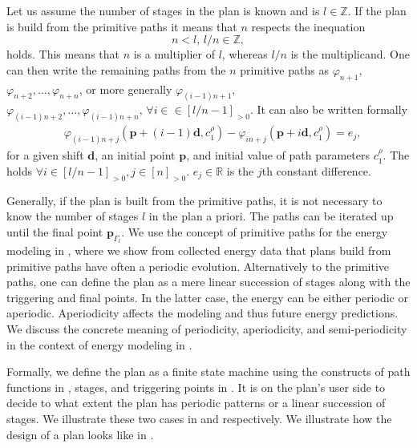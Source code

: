Let us assume the number of stages in the plan is known and is $l\in\mathbb{Z}$. If the plan is build from the primitive paths it means that $n$ respects the inequation
\begin{equation}
  n<l,\,l/n\in\mathbb{Z},
\end{equation}
holds. This means that $n$ is a multiplier of $l$, whereas $l/n$ is the multiplicand. One can then write the remaining paths from the $n$ primitive paths as $\varphi_{n+1},$ $\varphi_{n+2},\dots,\varphi_{n+n}$, or more generally $\varphi_{(i-1)n+1},$ $\varphi_{(i-1)n+2},\dots,\varphi_{(i-1)n+n},\,\forall i\in\in[l/n-1]_{>0}$. It can also be written formally
\begin{equation}\label{eq:primitive}\begin{split}
  &\varphi_{(i-1)n+j}(\mathbf{p}+(i-1)\mathbf{d},c_1^\rho)-\varphi_{in+j}(\mathbf{p}+i\mathbf{d},c_1^\rho)=e_j,
\end{split}\end{equation}
for a given shift $\mathbf{d}$, an initial point $\mathbf{p}$, and initial value of path parameters $c_1^\rho$. The  holds $\forall i\in[l/n-1]_{>0},j\in[n]_{>0}$. $e_j\in\mathbb{R}$ is the $j$th constant difference.

Generally, if the plan is built from the primitive paths, it is not necessary to know the number of stages $l$ in the plan a priori. The paths can be iterated up until the final point $\mathbf{p}_{\Gamma_l}$. We use the concept of primitive paths for the energy modeling in , where we show from collected energy data that plans build from primitive paths have often a periodic evolution. Alternatively to the primitive paths, one can define the plan as a mere linear succession of stages along with the triggering and final points. In the latter case, the energy can be either periodic or aperiodic. Aperiodicity affects the modeling and thus future energy predictions. We discuss the concrete meaning of periodicity, aperiodicity, and semi-periodicity in the context of energy modeling in .

Formally, we define the plan as a finite state machine using the constructs of path functions in , stages, and triggering points in . It is on the plan's user side to decide to what extent the plan has periodic patterns or a linear succession of stages. We illustrate these two cases in  and  respectively. We illustrate how the design of a plan looks like in . 

